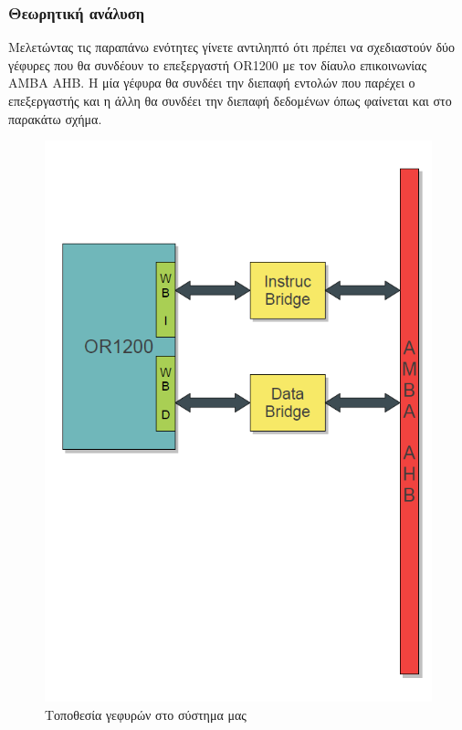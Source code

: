 \documentclass[a4paper,10pt]{article}
\numberwithin{figure}{section}
\numberwithin{table}{section}
\begin{document}
\subsubsection{Θεωρητική ανάλυση}

Μελετώντας τις παραπάνω ενότητες γίνετε αντιληπτό ότι πρέπει να σχεδιαστούν δύο γέφυρες που θα συνδέουν το επεξεργαστή OR1200 με τον δίαυλο επικοινωνίας AMBA AHB. Η μία γέφυρα θα συνδέει την διεπαφή εντολών που παρέχει ο επεξεργαστής και η άλλη θα συνδέει την διεπαφή δεδομένων όπως φαίνεται και στο παρακάτω σχήμα.

\begin{figure}[h!]
 \centering
 \includegraphics[bb=0 0 568 824,scale=0.5]{./Images/or1200-br-ahb.png}
 \caption{Τοποθεσία γεφυρών στο σύστημα μας}
\end{figure}
\end{document}
